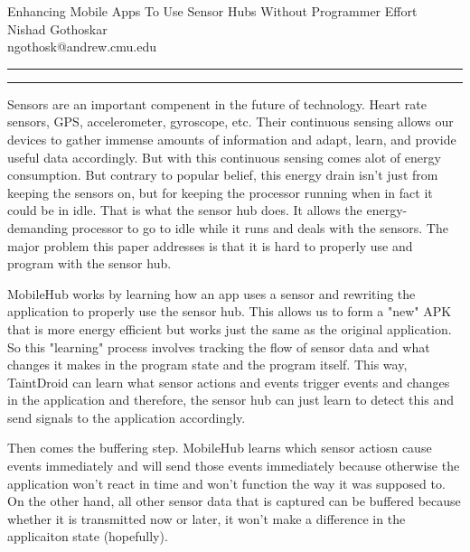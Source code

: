 \documentclass[11pt]{article}
\newcommand{\question}[2] {\vspace{.25in} \hrule\vspace{0.5em}
	\noindent{\bf #1: #2} \vspace{0.5em}
	\hrule \vspace{.10in}}
\newcommand{\myname}{Nishad Gothoskar}
\newcommand{\myandrew}{ngothosk}
\begin{document}
	
	\medskip                        %
	
	\thispagestyle{plain}
	\begin{center}                  %
		{\Large Enhancing Mobile Apps To Use Sensor Hubs Without Programmer Effort} \\
		\myname \\
		\myandrew @andrew.cmu.edu\\
	\end{center}
	
	\question{1}{Summary}
	\quad Sensors are an important compenent in the future of technology. Heart rate sensors, GPS, accelerometer, gyroscope, etc. Their continuous sensing allows our devices to gather immense amounts of information and adapt, learn, and provide useful data accordingly. But with this continuous sensing comes alot of energy consumption. But contrary to popular belief, this energy drain isn't just from keeping the sensors on, but for keeping the processor running when in fact it could be in idle. That is what the sensor hub does. It allows the energy-demanding processor to go to idle while it runs and deals with the sensors. The major problem this paper addresses is that it is hard to properly use and program with the sensor hub.
	
	\quad MobileHub works by learning how an app uses a sensor and rewriting the application to properly use the sensor hub. This allows us to form a "new" APK that is more energy efficient but works just the same as the original application. So this "learning" process involves tracking the flow of sensor data and what changes it makes in the program state and the program itself. This way, TaintDroid can learn what sensor actions and events trigger events and changes in the application and therefore, the sensor hub can just learn to detect this and send signals to the application accordingly.
	
	\quad Then comes the buffering step. MobileHub learns which sensor actiosn cause events immediately and will send those events immediately because otherwise the application won't react in time and won't function the way it was supposed to. On the other hand, all other sensor data that is captured can be buffered because whether it is transmitted now or later, it won't make a difference in the applicaiton state (hopefully). 
	
\end{document}
